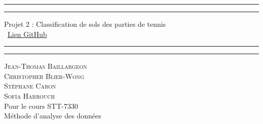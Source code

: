 \begin{titlepage}
	\centering %
	
	\scshape %
	
	\vspace*{\baselineskip} %
	
	
	\rule{\textwidth}{1.6pt}\vspace*{-\baselineskip}\vspace*{2pt} %
	\rule{\textwidth}{0.4pt} %
	
	\vspace{0.75\baselineskip} %
	
	{\LARGE Projet 2 : Classification de sols des parties de tennis\\} %
	\ \href{https://github.com/stecaron/stt-7330-projet-2}{Lien GitHub}
	\vspace{0.75\baselineskip} %
	
	\rule{\textwidth}{0.4pt}\vspace*{-\baselineskip}\vspace{3.2pt} %
	\rule{\textwidth}{1.6pt} %
	
	\vspace{2\baselineskip} %
	
	{\scshape\Large Jean-Thomas Baillargeon \\Christopher Blier-Wong\\Stéphane Caron\\Sofia Harrouch\\} %
	Pour le cours STT-7330\\
	Méthode d'analyse des données \\%
	
	\vspace*{3\baselineskip} %
	

\end{titlepage}
